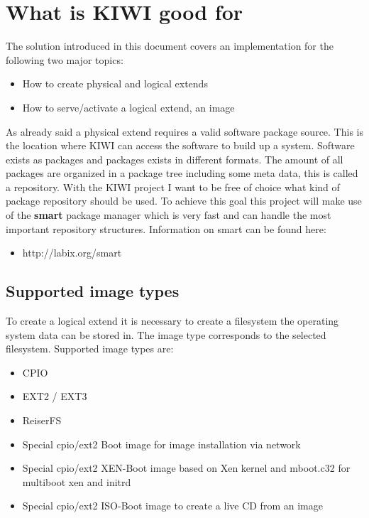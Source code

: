 
\section{What is KIWI good for}
The solution introduced in this document covers an implementation
for the following two major topics:

\begin{itemize}
	\item How to create physical and logical extends
	\item How to serve/activate a logical extend, an image
\end{itemize}

As already said a physical extend requires a valid software package
source. This is the location where KIWI can access the software to
build up a system. Software exists as packages and packages exists
in different formats. The amount of all packages are organized in
a package tree including some meta data, this is called a repository.
With the KIWI project I want to be free of choice what kind of
package repository should be used. To achieve this goal this project
will make use of the \textbf{smart} package manager which is very
fast and can handle the most important repository structures.
Information on smart can be found here:

\begin{itemize}
	\item http://labix.org/smart
\end{itemize}

\subsection{Supported image types}
To create a logical extend it is necessary to create a filesystem
the operating system data can be stored in. The image type corresponds
to the selected filesystem. Supported image types are:

\begin{itemize}
	\item CPIO
	\item EXT2 / EXT3
	\item ReiserFS
	\item Special cpio/ext2 Boot image for image installation via network
	\item Special cpio/ext2 XEN-Boot image based on Xen kernel
          and mboot.c32 for multiboot xen and initrd
	\item Special cpio/ext2 ISO-Boot image to create a live CD from
          an image 
\end{itemize}
